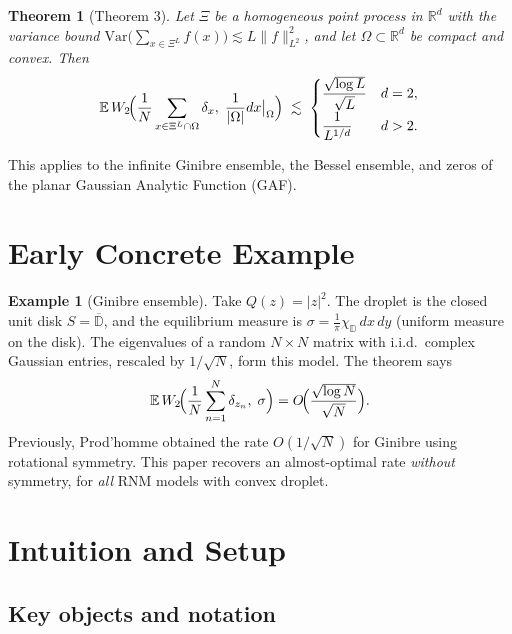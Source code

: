 \documentclass[11pt,a4paper]{article}
\newtheorem{theorem}{Theorem}
\theoremstyle{definition}
\newtheorem{example}{Example}
\begin{document}
\begin{theorem}[Theorem 3]
Let $\Xi$ be a homogeneous point process in $\mathbb{R}^d$ with the variance bound
$\mathrm{Var}\bigl(\sum_{x\in\Xi^L}f(x)\bigr)\lesssim L\|f\|_{L^2}^2$,
and let $\Omega\subset\mathbb{R}^d$ be compact and convex. Then
\[
\mathbb{E}\,W_2\!\Bigl(\frac{1}{N}\sum_{x\in\Xi^L\cap\Omega}\delta_x,\;\frac{1}{|\Omega|}dx\big|_\Omega\Bigr)
\;\lesssim\;
\begin{cases}
\dfrac{\sqrt{\log L}}{\sqrt{L}} & d=2,\\[6pt]
\dfrac{1}{L^{1/d}} & d>2.
\end{cases}
\]
\end{theorem}

This applies to the infinite Ginibre ensemble, the Bessel ensemble, and zeros of the planar Gaussian Analytic Function (GAF).

\section{Early Concrete Example}

\begin{example}[Ginibre ensemble]
Take $Q(z)=|z|^2$. The droplet is the closed unit disk $S=\overline{\mathbb{D}}$, and the equilibrium measure is $\sigma = \frac{1}{\pi}\chi_{\mathbb{D}}\,dx\,dy$ (uniform measure on the disk). The eigenvalues of a random $N\times N$ matrix with i.i.d.\ complex Gaussian entries, rescaled by $1/\sqrt{N}$, form this model. The theorem says
\[
\mathbb{E}\,W_2\!\Bigl(\frac{1}{N}\sum_{n=1}^N\delta_{z_n},\;\sigma\Bigr) = O\!\Bigl(\frac{\sqrt{\log N}}{\sqrt{N}}\Bigr).
\]
Previously, Prod'homme obtained the rate $O(1/\sqrt{N})$ for Ginibre using rotational symmetry. This paper recovers an almost-optimal rate \emph{without} symmetry, for \emph{all} RNM models with convex droplet.
\end{example}

\section{Intuition and Setup}

\subsection*{Key objects and notation}
\end{document}
